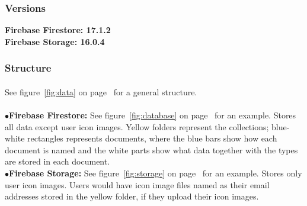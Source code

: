 \documentclass[12pt]{article}
\begin{document}
\subsubsection{Versions}
\hspace{12pt}\textbf{Firebase Firestore: 17.1.2} \\
\null\hspace{12pt}\textbf{Firebase Storage: 16.0.4}
\subsubsection{Structure}
\paragraph{}
See figure~\ref{fig:data} on page~\pageref{fig:data} for a general structure. \\ \\
\null\hspace{12pt}$\bullet$\enskip\textbf{Firebase Firestore:} See figure~\ref{fig:database} on page~\pageref{fig:database} for an example. Stores all data except user icon images. Yellow folders represent the collections; blue-white rectangles represents documents, where the blue bars show how each document is named and the white parts show what data together with the types are stored in each document. \\
\null\hspace{12pt}$\bullet$\enskip\textbf{Firebase Storage:} See figure~\ref{fig:storage} on page~\pageref{fig:storage} for an example. Stores only user icon images. Users would have icon image files named as their email addresses stored in the yellow folder, if they upload their icon images.
\end{document}

